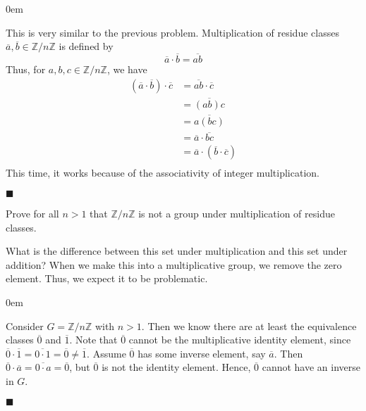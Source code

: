 \documentclass[12pt]{article}
\renewcommand{\qed}{\hfill$\blacksquare$}
\renewenvironment{proof}{\begin{addmargin}[1em]{0em}\begin{newproof}}{\end{newproof}\end{addmargin}\qed}
\newenvironment{problem}[2][Exercise]{\begin{trivlist}
\item[\hskip \labelsep {\bfseries #1}\hskip \labelsep {\bfseries #2.}]}{\end{trivlist}}
\begin{document}
\begin{proof}
This is very similar to the previous problem. Multiplication of residue classes $\overline{a},\overline{b}\in \mathbb{Z}/n\mathbb{Z}$ is defined by
$$ \overline{a}\cdot \overline{b} = \overline{ab} $$
Thus, for $a,b,c\in \mathbb{Z}/n\mathbb{Z}$, we have
\begin{equation*}
    \begin{split}
        \left(\overline{a}\cdot \overline{b}\right)\cdot \overline{c} & = \overline{ab}\cdot \overline{c} \\
        & = \overline{\left(ab\right)c} \\
        & = \overline{a\left(bc\right)} \\
        & = \overline{a}\cdot \overline{bc} \\
        & = \overline{a}\cdot \left(\overline{b}\cdot \overline{c}\right) \\
    \end{split}
\end{equation*}
This time, it works because of the associativity of integer multiplication.
\end{proof}





\begin{problem}{1.1.5}
Prove for all $n>1$ that $\mathbb{Z}/n\mathbb{Z}$ is not a group under multiplication of residue classes.
\end{problem}
What is the difference between this set under multiplication and this set under addition? When we make this into a multiplicative group, we remove the zero element. Thus, we expect it to be problematic. \\
\begin{proof}
Consider $G=\mathbb{Z}/n\mathbb{Z}$ with $n>1$. Then we know there are at least the equivalence classes $\overline{0}$ and $\overline{1}$. Note that $\overline{0}$ cannot be the multiplicative identity element, since $\overline{0}\cdot\overline{1}=\overline{0\cdot 1} = \overline{0}\neq \overline{1}$. Assume $\overline{0}$ has some inverse element, say $\overline{a}$. Then $\overline{0}\cdot\overline{a}=\overline{0\cdot a}=\overline{0}$, but $\overline{0}$ is not the identity element. Hence, $\overline{0}$ cannot have an inverse in $G$.
\end{proof}
\end{document}
